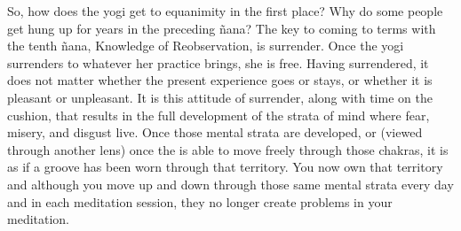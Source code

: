\documentclass[a5paper,10pt,english]{book}
\begin{document}
\sphinxAtStartPar
So, how does the yogi get to equanimity in the first place? Why do some
people get hung up for years in the preceding ñana? The key to coming to
terms with the tenth ñana, Knowledge of Re\sphinxhyphen{}observation, is surrender.
Once the yogi surrenders to whatever her practice brings, she is free.
Having surrendered, it does not matter whether the present experience
goes or stays, or whether it is pleasant or unpleasant. It is this attitude
of surrender, along with time on the cushion, that results in the full
development of the strata of mind where fear, misery, and disgust live.
Once those mental strata are developed, or (viewed through another lens)
once the  is able to move freely through those
chakras, it is as if a groove has been worn through that territory. You
now own that territory and although you move up and down through those
same mental strata every day and in each meditation session, they no
longer create problems in your meditation.
\end{document}
